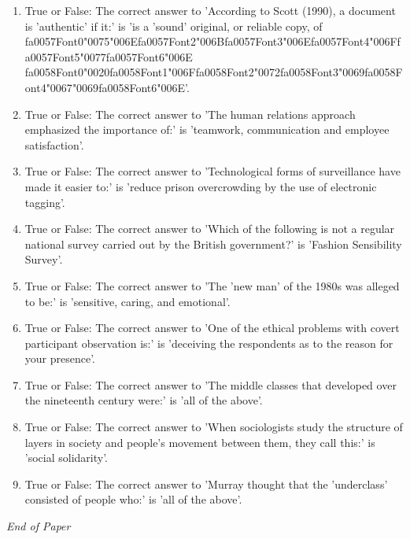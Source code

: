 \documentclass[12pt]{article}
\begin{document}
\begin{enumerate}[label=\arabic*.]
\item True or False: The correct answer to 'According to Scott (1990), a document is 'authentic' if it:' is 'is a 'sound' original, or reliable copy, of {\csname fa0057Font0\endcsname\char"0075}{\char"006E}{\csname fa0057Font2\endcsname\char"006B}{\csname fa0057Font3\endcsname\char"006E}{\csname fa0057Font4\endcsname\char"006F}{\csname fa0057Font5\endcsname\char"0077}{\csname fa0057Font6\endcsname\char"006E} {\csname fa0058Font0\endcsname\char"0020}{\csname fa0058Font1\endcsname\char"006F}{\csname fa0058Font2\endcsname\char"0072}{\csname fa0058Font3\endcsname\char"0069}{\csname fa0058Font4\endcsname\char"0067}{\char"0069}{\csname fa0058Font6\endcsname\char"006E}'.
\item True or False: The correct answer to 'The human relations approach emphasized the importance of:' is 'teamwork, communication and employee satisfaction'.
\item True or False: The correct answer to 'Technological forms of surveillance have made it easier to:' is 'reduce prison overcrowding by the use of electronic tagging'.
\item True or False: The correct answer to 'Which of the following is not a regular national survey carried out by the British government?' is 'Fashion Sensibility Survey'.
\item True or False: The correct answer to 'The 'new man' of the 1980s was alleged to be:' is 'sensitive, caring, and emotional'.
\item True or False: The correct answer to 'One of the ethical problems with covert participant observation is:' is 'deceiving the respondents as to the reason for your presence'.
\item True or False: The correct answer to 'The middle classes that developed over the nineteenth century were:' is 'all of the above'.
\item True or False: The correct answer to 'When sociologists study the structure of layers in society and people's movement between them, they call this:' is 'social solidarity'.
\item True or False: The correct answer to 'Murray thought that the 'underclass' consisted of people who:' is 'all of the above'.
\end{enumerate}

\vfill
\noindent\textit{End of Paper}
\end{document}
